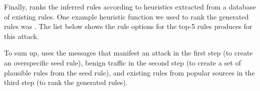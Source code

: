 \documentclass[sigconf,review, anonymous]{acmart}
\begin{document}
 








Finally, \tname{} ranks the inferred rules according to heuristics
extracted from a database of existing rules. One example heuristic
function we used to rank the generated rules was
. The list below shows the rule options for the
top-5 rules \tname{} produces for this attack.


To sum up, \tname{} uses the messages that manifest an attack in the
first step (to create an overspecific seed rule), benign traffic in
the second step (to create a set of plausible rules from the seed
rule), and existing rules from popular sources in the third step (to
rank the generated rules).
\end{document}
